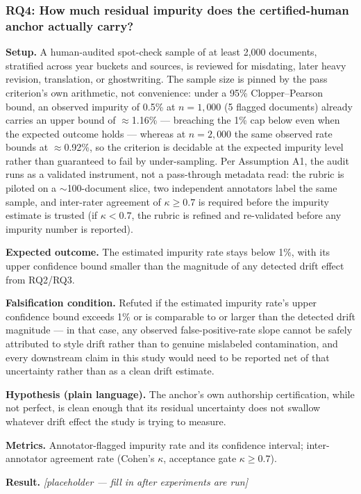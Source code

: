 \documentclass[11pt]{article}
\newcommand{\ph}{\textit{[placeholder --- fill in after experiments are run]}}
\begin{document}
\subsubsection{RQ4: How much residual impurity does the certified-human anchor actually carry?}
\textbf{Setup.} A human-audited spot-check sample of at least 2,000 documents, stratified across year buckets and sources, is reviewed for misdating, later heavy revision, translation, or ghostwriting. The sample size is pinned by the pass criterion's own arithmetic, not convenience: under a 95\% Clopper--Pearson bound, an observed impurity of 0.5\% at $n = 1{,}000$ (5 flagged documents) already carries an upper bound of $\approx$1.16\% --- breaching the 1\% cap below even when the expected outcome holds --- whereas at $n = 2{,}000$ the same observed rate bounds at $\approx$0.92\%, so the criterion is decidable at the expected impurity level rather than guaranteed to fail by under-sampling. Per Assumption A1, the audit runs as a validated instrument, not a pass-through metadata read: the rubric is piloted on a $\sim$100-document slice, two independent annotators label the same sample, and inter-rater agreement of $\kappa \geq 0.7$ is required before the impurity estimate is trusted (if $\kappa < 0.7$, the rubric is refined and re-validated before any impurity number is reported).

\textbf{Expected outcome.} The estimated impurity rate stays below 1\%, with its upper confidence bound smaller than the magnitude of any detected drift effect from RQ2/RQ3.

\textbf{Falsification condition.} Refuted if the estimated impurity rate's upper confidence bound exceeds 1\% or is comparable to or larger than the detected drift magnitude --- in that case, any observed false-positive-rate slope cannot be safely attributed to style drift rather than to genuine mislabeled contamination, and every downstream claim in this study would need to be reported net of that uncertainty rather than as a clean drift estimate.

\textbf{Hypothesis (plain language).} The anchor's own authorship certification, while not perfect, is clean enough that its residual uncertainty does not swallow whatever drift effect the study is trying to measure.

\textbf{Metrics.} Annotator-flagged impurity rate and its confidence interval; inter-annotator agreement rate (Cohen's $\kappa$, acceptance gate $\kappa \geq 0.7$).

\textbf{Result.} \ph
\end{document}
